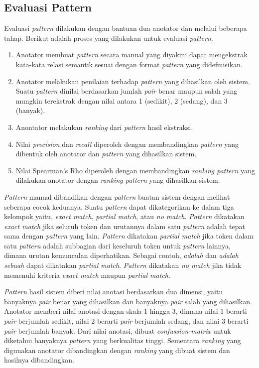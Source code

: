 \subsection{Evaluasi Pattern}
Evaluasi \textit{pattern} dilakukan dengan bantuan dua anotator dan melalui beberapa tahap. Berikut adalah proses yang dilakukan untuk evaluasi \textit{pattern}.
\begin{enumerate}
  \item Anotator membuat \textit{pattern} secara manual yang diyakini dapat mengekstrak kata-kata relasi semantik sesuai dengan format \textit{pattern} yang didefinisikan.
  \item Anotator melakukan penilaian terhadap \textit{pattern} yang dihasilkan oleh sistem. Suatu \textit{pattern} dinilai berdasarkan jumlah \textit{pair} benar maupun salah yang mungkin terekstrak dengan nilai antara 1 (sedikit), 2 (sedang), dan 3 (banyak).
  \item Anontator melakukan \textit{ranking} dari \textit{pattern} hasil ekstraksi.
  \item Nilai \textit{precision} dan \textit{recall} diperoleh dengan membandingkan \textit{pattern} yang dibentuk oleh anotator dan \textit{pattern} yang dihasilkan sistem.
  \item Nilai Spearman's Rho diperoleh dengan membandingkan \textit{ranking pattern} yang dilakukan anotator dengan \textit{ranking pattern} yang dihasilkan sistem.
\end{enumerate}

\textit{Pattern} manual dibandikan dengan \textit{pattern} buatan sistem dengan melihat seberapa cocok keduanya. Suatu \textit{pattern} dapat dikategorikan ke dalam tiga kelompok yaitu, \textit{exact match}, \textit{partial match}, atau \textit{no match}. \textit{Pattern} dikatakan \textit{exact match} jika seluruh token dan urutannya dalam satu \textit{pattern} adalah tepat sama dengan \textit{pattern} yang lain. \textit{Pattern} dikatakan \textit{partial match} jika token dalam satu \textit{pattern} adalah subbagian dari keseluruh token untuk \textit{pattern} lainnya, dimana urutan kemunculan diperhatikan. Sebagai contoh, \textit{{\tagHypernym} adalah {\tagHyponym}} dan \textit{{\tagHypernym} adalah sebuah {\tagHyponym}} dapat dikatakan \textit{partial match}. \textit{Pattern} dikatakan \textit{no match} jika tidak memenuhi kriteria \textit{exact match} maupun \textit{partial match}.

\textit{Pattern} hasil sistem diberi nilai anotasi berdasarkan dua dimensi, yaitu banyaknya \textit{pair} benar yang dihasilkan dan banyaknya \textit{pair} salah yang dihasilkan. Anotator memberi nilai anotasi dengan skala 1 hingga 3, dimana nilai 1 berarti \textit{pair} berjumlah sedikit, nilai 2 berarti \textit{pair} berjumlah sedang, dan nilai 3 berarti \textit{pair} berjumlah banyak. Dari nilai anotasi, dibuat \textit{confussion-matrix} untuk diketahui banyaknya \textit{pattern} yang berkualitas tinggi. Sementara \textit{ranking} yang digunakan anotator dibandingkan dengan \textit{ranking} yang dibuat sistem dan hasilnya dibandingkan.

